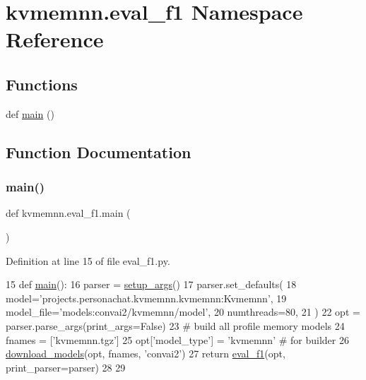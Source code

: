 \hypertarget{namespacekvmemnn_1_1eval__f1}{}\section{kvmemnn.\+eval\+\_\+f1 Namespace Reference}
\label{namespacekvmemnn_1_1eval__f1}
\subsection*{Functions}
\begin{DoxyCompactItemize}
\item 
def \hyperlink{namespacekvmemnn_1_1eval__f1_a37c672effdc33f74f7d18f8c12cd3a52}{main} ()
\end{DoxyCompactItemize}


\subsection{Function Documentation}
\mbox{\label{namespacekvmemnn_1_1eval__f1_a37c672effdc33f74f7d18f8c12cd3a52}} 
\subsubsection{\texorpdfstring{main()}{main()}}
{\footnotesize\ttfamily def kvmemnn.\+eval\+\_\+f1.\+main (\begin{DoxyParamCaption}{ }\end{DoxyParamCaption})}



Definition at line 15 of file eval\+\_\+f1.\+py.


\begin{DoxyCode}
15 \textcolor{keyword}{def }\hyperlink{namespaceseq2seq_1_1eval__f1_a99ede4f55975fd62d1d5834b72fa03c7}{main}():
16     parser = \hyperlink{namespaceprojects_1_1convai2_1_1eval__f1_a74826f78ce1ce6c9fe9b6d4a6297f3bd}{setup\_args}()
17     parser.set\_defaults(
18         model=\textcolor{stringliteral}{'projects.personachat.kvmemnn.kvmemnn:Kvmemnn'},
19         model\_file=\textcolor{stringliteral}{'models:convai2/kvmemnn/model'},
20         numthreads=80,
21     )
22     opt = parser.parse\_args(print\_args=\textcolor{keyword}{False})
23     \textcolor{comment}{# build all profile memory models}
24     fnames = [\textcolor{stringliteral}{'kvmemnn.tgz'}]
25     opt[\textcolor{stringliteral}{'model\_type'}] = \textcolor{stringliteral}{'kvmemnn'}  \textcolor{comment}{# for builder}
26     \hyperlink{namespaceparlai_1_1core_1_1build__data_ab697f23f05d3e36d7979fe5e0ed7911e}{download\_models}(opt, fnames, \textcolor{stringliteral}{'convai2'})
27     \textcolor{keywordflow}{return} \hyperlink{namespaceprojects_1_1convai2_1_1eval__f1_aac16a2ead8ff2b896c82411fe262f449}{eval\_f1}(opt, print\_parser=parser)
28 
29 
\end{DoxyCode}
